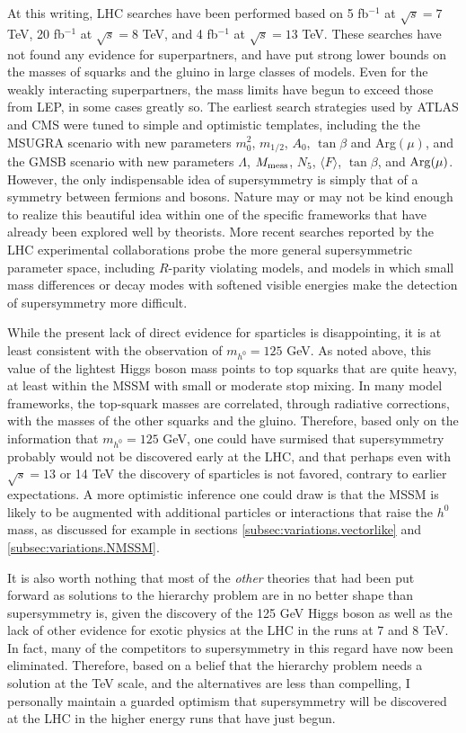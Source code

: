 \documentclass[12pt]{article}
\def\nmess{N_5}
\begin{document}
At this writing, LHC searches have been performed
based on 5 fb$^{-1}$ at $\sqrt{s} = 7$ TeV,
20 fb$^{-1}$ at $\sqrt{s} = 8$ TeV, and 4 fb$^{-1}$ at $\sqrt{s} = 13$ TeV.
These searches have not found any evidence for superpartners, and 
have put strong lower bounds on the masses of squarks and the gluino in 
large classes of models. Even for the weakly interacting 
superpartners, the mass limits have begun to exceed those from LEP, in some 
cases greatly so. The earliest search strategies used by ATLAS and CMS were 
tuned to simple and optimistic templates, including the the MSUGRA 
scenario with new parameters $m^2_0$, $m_{1/2}$, $A_0$, $\tan\beta$ and 
Arg$(\mu )$, and the GMSB scenario with new parameters $\Lambda$, 
$M_{\rm mess}$, $\nmess$, $\langle F \rangle$, $\tan\beta$, and ${\rm 
Arg}(\mu )$. However, the only indispensable idea of supersymmetry is 
simply that of a symmetry between fermions and bosons. Nature may or may 
not be kind enough to realize this beautiful idea within one of the 
specific frameworks that have already been explored well by theorists. 
More recent searches reported by the LHC experimental collaborations 
probe the more general supersymmetric parameter space, including 
$R$-parity violating models, and models in which small mass differences 
or decay modes with softened visible energies  
make the detection of supersymmetry more difficult.

While the present lack of direct evidence for sparticles is 
disappointing, it is at least consistent with the observation of 
$m_{h^0} = 125$ GeV. As noted above, this value of the lightest Higgs 
boson mass points to top squarks that are quite heavy, at least within 
the MSSM with small or moderate stop mixing. In many model frameworks, 
the top-squark masses are correlated, through radiative corrections, 
with the masses of the other squarks and the gluino. Therefore, based only on 
the information that $m_{h^0} = 125$ GeV, one could have surmised 
that supersymmetry probably would not be discovered early at the LHC, and that 
perhaps even with $\sqrt{s} =13$ or 14 TeV the discovery of sparticles is 
not favored, contrary to earlier expectations. A more 
optimistic inference one could draw is that the MSSM is likely to be augmented 
with additional particles or interactions that raise the $h^0$ mass, as 
discussed for example in sections \ref{subsec:variations.vectorlike}
and \ref{subsec:variations.NMSSM}.

It is also worth nothing that most of the {\em other} theories that had been 
put forward as solutions to the hierarchy problem are in no better 
shape than supersymmetry is, given the discovery of the 
125 GeV Higgs boson as well as the lack of other evidence for 
exotic physics at the LHC in the runs at 7 and 8 TeV. 
In fact, many of the competitors to supersymmetry 
in this regard have now been eliminated. Therefore, based on a belief that 
the hierarchy problem needs a solution at the TeV scale, and the alternatives are less than compelling,
I personally maintain a guarded optimism that supersymmetry 
will be discovered at the LHC in the higher energy runs that have just begun. 
\end{document}
